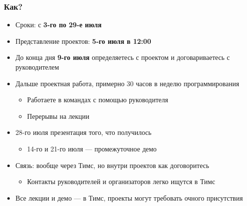 \documentclass{../../slides-style}
\begin{document}
    \begin{frame}
        \frametitle{Как?}
        \begin{itemize}
            \item Сроки: с \textbf{3-го по 29-е июля}
            \item Представление проектов: \textbf{5-го июля в 12:00}
            \item До конца дня \textbf{9-го июля} определяетесь с проектом и договариваетесь с руководителем
            \item Дальше проектная работа, примерно 30 часов в неделю программирования
            \begin{itemize}
                \item Работаете в командах с помощью руководителя
                \item Перерывы на лекции
            \end{itemize}
            \item 28-го июля презентация того, что получилось
            \begin{itemize}
                \item 14-го и 21-го июля --- промежуточное демо
            \end{itemize}
            \item Связь: вообще через Тимс, но внутри проектов как договоритесь
            \begin{itemize}
                \item Контакты руководителей и организаторов легко ищутся в Тимс
            \end{itemize}
            \item Все лекции и демо --- в Тимс, проекты могут требовать очного присутствия
        \end{itemize}
    \end{frame}
\end{document}
